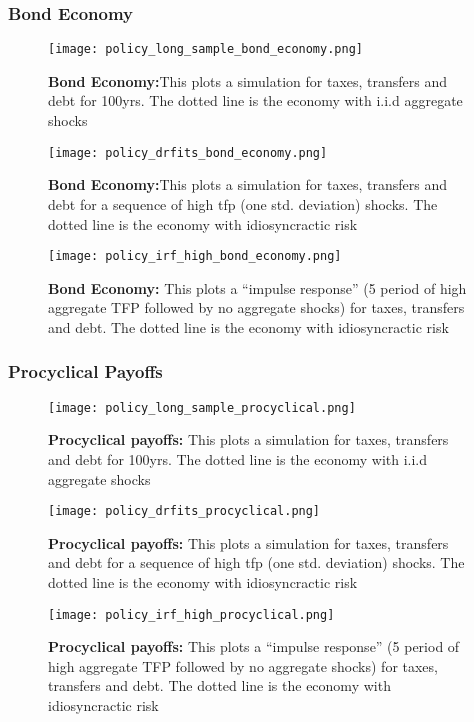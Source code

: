 \documentclass[thmsb,11pt]{article}
\begin{document}
\subsubsection{Bond Economy}

\begin{figure}[htp]
\texttt{[image: policy\_long\_sample\_bond\_economy.png]}
\caption{\textbf{Bond Economy:}This plots a simulation for taxes, transfers and debt for 100yrs. The dotted line is the economy with i.i.d aggregate shocks}
\label{fig:}
\end{figure}


\begin{figure}[htp]
\texttt{[image: policy\_drfits\_bond\_economy.png]}
\caption{\textbf{Bond Economy:}This plots a simulation for taxes, transfers and debt for a sequence of high tfp (one std. deviation) shocks. The dotted line is the economy with idiosyncractic risk}
\label{fig:}
\end{figure}



\begin{figure}[htp]
\texttt{[image: policy\_irf\_high\_bond\_economy.png]}
\caption{\textbf{Bond Economy:} This plots a ``impulse response'' (5 period of high aggregate TFP followed by no aggregate shocks) for taxes, transfers and debt. The dotted line is the economy with idiosyncractic risk}
\label{fig:}
\end{figure}


\subsubsection{Procyclical Payoffs}

\begin{figure}[htp]
\texttt{[image: policy\_long\_sample\_procyclical.png]}
\caption{\textbf{Procyclical payoffs:} This plots a simulation for taxes, transfers and debt for 100yrs. The dotted line is the economy with i.i.d aggregate shocks}
\label{fig:}
\end{figure}


\begin{figure}[htp]
\texttt{[image: policy\_drfits\_procyclical.png]}
\caption{\textbf{Procyclical payoffs:} This plots a simulation for taxes, transfers and debt for a sequence of high tfp (one std. deviation) shocks. The dotted line is the economy with idiosyncractic risk}
\label{fig:}
\end{figure}



\begin{figure}[htp]
\texttt{[image: policy\_irf\_high\_procyclical.png]}
\caption{\textbf{Procyclical payoffs:} This plots a ``impulse response'' (5 period of high aggregate TFP followed by no aggregate shocks) for taxes, transfers and debt. The dotted line is the economy with idiosyncractic risk}
\label{fig:}
\end{figure}
\end{document}
